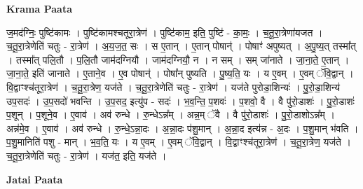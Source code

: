 \documentclass[17pt]{extarticle}
\begin{document}
\textbf{Krama Paata} \newline

ज॒मद॑ग्निः॒ पुष्टि॑कामः । पुष्टि॑कामश्चतूरा॒त्रेण॑ । पुष्टि॑काम॒ इति॒ पुष्टि॑ - का॒मः॒ । च॒तू॒रा॒त्रेणा॑यजत । च॒तू॒रा॒त्रेणेति॑ चतुः - रा॒त्रेण॑ । अ॒य॒ज॒त॒ सः । स ए॒तान् । ए॒तान् पोषान्॑ । पोषाꣳ॑ अपुष्यत् । अ॒पु॒ष्य॒त् तस्मा᳚त् । तस्मा᳚त् पलि॒तौ । प॒लि॒तौ जाम॑दग्नियौ । जाम॑दग्नियौ॒ न । न सम् । सम् जा॑नाते । जा॒ना॒ते॒ ए॒तान् । जा॒ना॒ते॒ इति॑ जानाते । ए॒ताने॒व । ए॒व पोषान्॑ । पोषा᳚न् पुष्यति । पु॒ष्य॒ति॒ यः । य ए॒वम् । ए॒वम् ॅवि॒द्वान् । वि॒द्वाꣳश्च॑तूरा॒त्रेण॑ । च॒तू॒रा॒त्रेण॒ यज॑ते । च॒तू॒रा॒त्रेणेति॑ चतुः - रा॒त्रेण॑ । यज॑ते पुरोडा॒शिन्यः॑ । पु॒रो॒डा॒शिन्य॑ उप॒सदः॑ । उ॒प॒सदो॑ भवन्ति । उ॒प॒सद॒ इत्यु॑प - सदः॑ । भ॒व॒न्ति॒ प॒शवः॑ । प॒शवो॒ वै । वै पु॑रो॒डाशः॑ । पु॒रो॒डाशः॑ प॒शून् । प॒शूने॒व । ए॒वाव॑ । अव॑ रुन्धे । रु॒न्धेऽन्न᳚म् । अन्न॒म् ॅवै । वै पु॑रो॒डाशः॑ । पु॒रो॒डाशोऽन्न᳚म् । अन्न॑मे॒व । ए॒वाव॑ । अव॑ रुन्धे । रु॒न्धे॒ऽन्ना॒दः । अ॒न्ना॒दः प॑शु॒मान् । अ॒न्ना॒द इत्य॑न्न - अ॒दः । प॒शु॒मान् भ॑वति । प॒शु॒मानिति॑ पशु - मान् । भ॒व॒ति॒ यः । य ए॒वम् । ए॒वम् ॅवि॒द्वान् । वि॒द्वाꣳश्च॑तूरा॒त्रेण॑ । च॒तू॒रा॒त्रेण॒ यज॑ते । च॒तू॒रा॒त्रेणेति॑ चतुः - रा॒त्रेण॑ । यज॑त॒ इति॒ यज॑ते । \newline

\textbf{Jatai Paata} \newline
\end{document}
